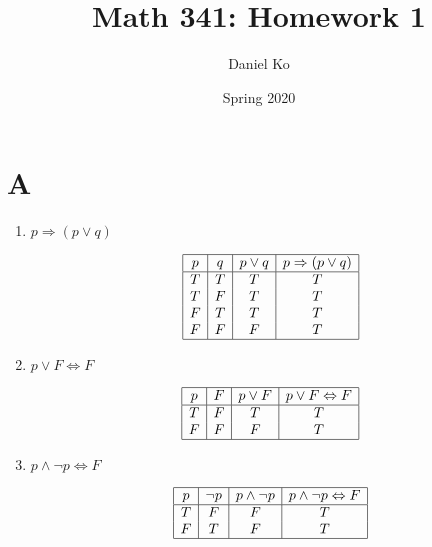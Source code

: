 \documentclass[11pt]{scrartcl}
\title{Math 341: Homework 1}
\author{Daniel Ko}
\date{Spring 2020}
\begin{document}
\maketitle

\section{A}
\begin{enumerate}[label=\alph*.]
	\item{
		$p \Rightarrow (p \lor q)$
		\begin{center}
		\begin{displaymath}
		\begin{array}{|c|c|c|c|}
			\hline
			p & q & p \lor q & p \Rightarrow (p \lor q) \\ 
			\hline
			T & T & T & T\\
			T & F & T & T\\
			F & T & T & T\\
			F & F & F & T\\
			\hline
		\end{array}
		\end{displaymath}
		\end{center}
		}
	\item{
		$p \lor F \Leftrightarrow F$
		\begin{center}
		\begin{displaymath}
		\begin{array}{|c|c|c|c|}
			\hline
			p & F & p \lor F & p \lor F \Leftrightarrow F \\ 
			\hline
			T & F & T & T\\
			F & F & F & T\\
			\hline
		\end{array}
		\end{displaymath}
		\end{center}
		}
	\item{
		$p \land \lnot p \Leftrightarrow F$
		\begin{center}
		\begin{displaymath}
		\begin{array}{|c|c|c|c|}
			\hline
			p & \lnot p & p \land \lnot p & p \land \lnot p \Leftrightarrow F\\ 
			\hline
			T & F & F & T\\
			F & T & F & T\\
			\hline
		\end{array}
		\end{displaymath}
		\end{center}
}
\end{enumerate}
\end{document}
